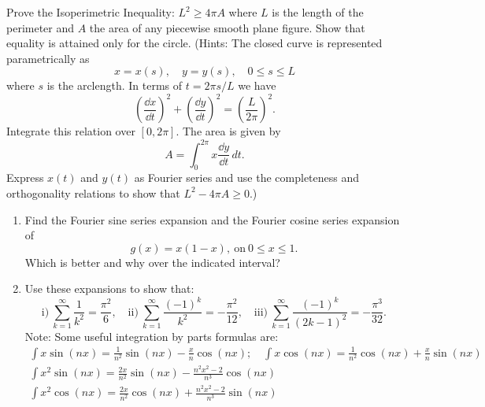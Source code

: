 {%
\begin{Exercise}
  Prove the Isoperimetric Inequality: $L^2 \geq 4 \pi A$ where $L$ is the length
  of the perimeter and $A$ the area of any piecewise smooth plane figure.
  Show that equality is attained only for the circle.  (Hints:  The closed curve
  is represented parametrically as
  \[
  x = x(s), \quad y = y(s), \quad 0 \leq s \leq L
  \]
  where $s$ is the arclength.  In terms of $t = 2 \pi s / L$ we have
  \[
  \left( \frac{\dd x}{\dd t} \right)^2 + \left( \frac{\dd y}{\dd t} \right)^2 
  = \left( \frac{L}{2 \pi} \right)^2.
  \]
  Integrate this relation over $[0,2\pi]$.  The area is given by
  \[
  A = \int_0^{2\pi} x \frac{\dd y}{\dd t} \,d t.
  \]
  Express $x(t)$ and $y(t)$ as Fourier series and use the completeness and
  orthogonality relations to show that $L^2 - 4 \pi A \geq 0$.)
\end{Exercise}






\begin{Exercise}
  \begin{enumerate}
  \item
    Find the Fourier sine series expansion and the Fourier cosine series 
    expansion of
    \[
    g(x) = x (1-x),\ \mathrm{on}\ 0 \leq x \leq 1.
    \]
    Which is better and why over the indicated interval?
  \item
    Use these expansions to show that:
    \[
    \mathrm{i)}\ 
    \sum_{k = 1}^\infty \frac{1}{k^2} = \frac{\pi^2}{6}, \quad
    \mathrm{ii)}\ 
    \sum_{k = 1}^\infty \frac{(-1)^k}{k^2} = -\frac{\pi^2}{12}, \quad
    \mathrm{iii)}\ 
    \sum_{k = 1}^\infty \frac{(-1)^k}{(2k-1)^2} = - \frac{\pi^3}{32}.
    \]
    Note: Some useful integration by parts formulas are:
    \begin{gather*}
      \int x \sin(n x) = \frac{1}{n^2} \sin(n x) - \frac{x}{n} \cos(n x); \quad
      \int x \cos(n x) = \frac{1}{n^2} \cos(n x) + \frac{x}{n} \sin(n x) \\
      \int x^2 \sin(n x) = \frac{2 x}{n^2} \sin(n x) 
      - \frac{n^2 x^2 - 2}{n^3} \cos(n x) \\
      \int x^2 \cos(n x) = \frac{2 x}{n^2} \cos(n x) 
      + \frac{n^2 x^2 - 2}{n^3} \sin(n x)
    \end{gather*}
  \end{enumerate}
\end{Exercise}








\raggedbottom
}
